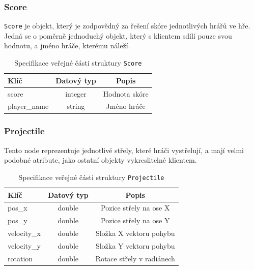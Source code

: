 \documentclass[12pt, a4paper]{article}
\begin{document}
    \subsubsection*{Score}
    \texttt{Score} je objekt, který je zodpovědný za řešení skóre jednotlivých hrářů ve hře.
    Jedná se o poměrně jednoduchý objekt, který s klientem sdílí pouze svou hodnotu, a jméno hráče, kterému náleží.

    \begin{table}[H]
        \centering
        \begin{tabular}{|l|c|c|}
            \hline
            Klíč & Datový typ & Popis\\
            \hline
            \hline
            score & integer & Hodnota skóre\\
            \hline
            player\_name & string & Jméno hráče\\
            \hline
        \end{tabular}
        \caption{Specifikace veřejné části struktury \texttt{Score}}
    \end{table}

    \subsubsection*{Projectile}
    Tento node reprezentuje jednotlivé střely, které hráči vystřelují, a mají velmi podobné atribute, jako ostatní objekty vykreslitelné klientem.

    \begin{table}[H]
        \centering
        \begin{tabular}{|l|c|c|}
            \hline
            Klíč & Datový typ & Popis\\
            \hline
            \hline
            pos\_x & double & Pozice střely na ose X\\
            \hline
            pos\_y & double & Pozice střely na ose Y\\
            \hline
            velocity\_x & double & Složka X vektoru pohybu\\
            \hline
            velocity\_y & double & Složka Y vektoru pohybu\\
            \hline
            rotation & double & Rotace střely v radiánech\\
            \hline
        \end{tabular}
        \caption{Specifikace veřejné části struktury \texttt{Projectile}}
    \end{table}
\end{document}

